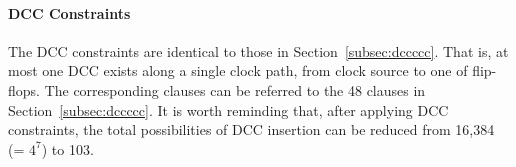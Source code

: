 \paragraph{DCC Constraints}
\label{sec:TVA:dcc_c}
The DCC constraints are identical to those in Section~\ref{subsec:dccccc}. That is, at most one DCC exists along a single clock path, from clock source to one of flip-flops. The corresponding clauses can be referred to the 48 clauses in Section~\ref{subsec:dccccc}. It is worth reminding that, after applying DCC constraints, the total possibilities of DCC insertion can be reduced from 16,384 (= $4^7$) to 103. 

